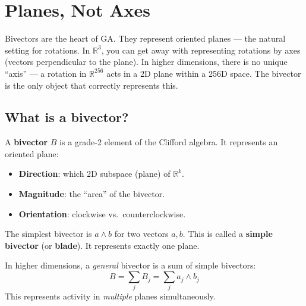 \documentclass[11pt, twoside, openright]{memoir}
\newcommand{\op}{\wedge}          %
\begin{document}
\chapter{Planes, Not Axes}
\label{chap:bivectors}

\begin{whycare}
Bivectors are the heart of GA.  They represent oriented planes --- the
natural setting for rotations.  In $\mathbb{R}^3$, you can get away with
representing rotations by axes (vectors perpendicular to the plane).  In
higher dimensions, there is no unique ``axis'' --- a rotation in
$\mathbb{R}^{256}$ acts in a 2D plane within a 256D space.  The bivector
is the only object that correctly represents this.
\end{whycare}

\section{What is a bivector?}

A \textbf{bivector} $B$ is a grade-2 element of the Clifford algebra.
It represents an oriented plane:

\begin{itemize}[nosep]
\item \textbf{Direction}: which 2D subspace (plane) of $\mathbb{R}^k$.
\item \textbf{Magnitude}: the ``area'' of the bivector.
\item \textbf{Orientation}: clockwise vs.\ counterclockwise.
\end{itemize}

The simplest bivector is $a \op b$ for two vectors $a, b$.  This is
called a \textbf{simple bivector} (or \textbf{blade}).  It represents
exactly one plane.

In higher dimensions, a \emph{general} bivector is a sum of simple
bivectors:
\[
  B = \sum_{j} B_j = \sum_{j} a_j \op b_j
\]
This represents activity in \emph{multiple} planes simultaneously.
\end{document}
